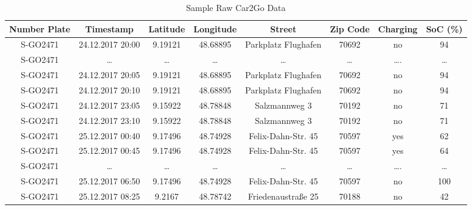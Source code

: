 \documentclass[a4paper, 12pt]{article}
\begin{document}
\begin{table}
    \caption{Sample Raw Car2Go Data \label{table-car2go-raw}}
    \centering
    \begin{tabular}{c|ccccccc}
      \hline
      \hline
      Number Plate & Timestamp & Latitude & Longitude & Street & Zip Code & Charging & SoC (\%)\\
      \hline
      S-GO2471 & 24.12.2017 20:00 & 9.19121 & 48.68895 & Parkplatz Flughafen & 70692 & no & 94\\
      S-GO2471 & \ldots{} & \ldots{} & \ldots{} & \ldots{} & \ldots{} & \ldots{}. & \ldots{}\\
      S-GO2471 & 24.12.2017 20:05 & 9.19121 & 48.68895 & Parkplatz Flughafen & 70692 & no & 94\\
      S-GO2471 & 24.12.2017 20:10 & 9.19121 & 48.68895 & Parkplatz Flughafen & 70692 & no & 94\\
      S-GO2471 & 24.12.2017 23:05 & 9.15922 & 48.78848 & Salzmannweg 3 & 70192 & no & 71\\
      S-GO2471 & 24.12.2017 23:10 & 9.15922 & 48.78848 & Salzmannweg 3 & 70192 & no & 71\\
      S-GO2471 & 25.12.2017 00:40 & 9.17496 & 48.74928 & Felix-Dahn-Str. 45 & 70597 & yes & 62\\
      S-GO2471 & 25.12.2017 00:45 & 9.17496 & 48.74928 & Felix-Dahn-Str. 45 & 70597 & yes & 64\\
      S-GO2471 & \ldots{} & \ldots{} & \ldots{} & \ldots{} & \ldots{} & \ldots{}. & \ldots{}\\
      S-GO2471 & 25.12.2017 06:50 & 9.17496 & 48.74928 & Felix-Dahn-Str. 45 & 70597 & no & 100\\
      S-GO2471 & 25.12.2017 08:25 & 9.2167 & 48.78742 & Friedenaustraße 25 & 70188 & no & 42\\
      \hline
      \hline
    \end{tabular}

    \bigskip\bigskip  %


\end{table}
\end{document}
